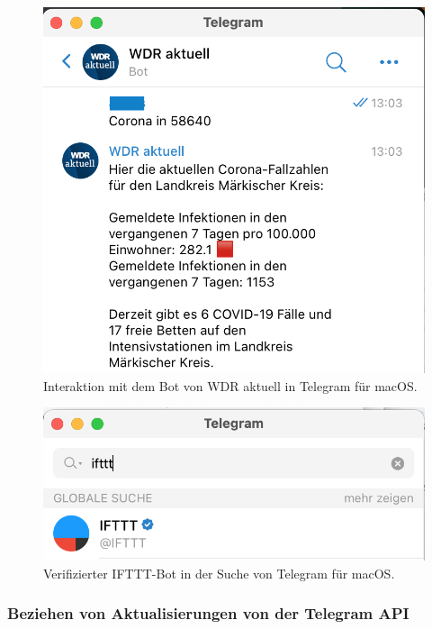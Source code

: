 \begin{figure}[h!]
\centering
\includegraphics[scale=0.7]{telegram-bot-beispiel}
\caption{Interaktion mit dem Bot von WDR aktuell in Telegram für macOS.}
\end{figure}

\begin{figure}[h!]
\centering
\includegraphics[scale=0.7]{verified_ifttt_bot}
\caption{Verifizierter IFTTT-Bot in der Suche von Telegram für macOS.}
\end{figure}

\subsubsection{Beziehen von Aktualisierungen von der Telegram API}
\label{sec:telegram-getting-updates}

